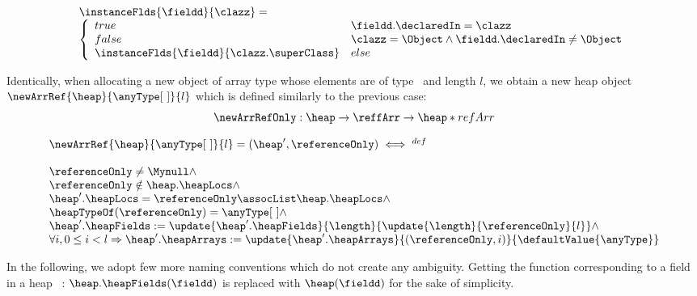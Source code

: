 $$
 \begin{array}{l}
       \instanceFlds{\fieldd}{\clazz } = \\
       \left\{\begin{array}{ll}
                    true  & \fieldd.\declaredIn = \clazz \\
		    false & \clazz = \Object \wedge \fieldd.\declaredIn \neq \Object \\
		    \instanceFlds{\fieldd}{\clazz.\superClass} & else
       \end{array}\right.
 \end{array}
$$


Identically, when allocating a new object of array type whose elements are of type \anyType \ and length $l$, we obtain 
a new heap object  $\newArrRef{\heap}{\anyType \lbrack \ \rbrack  }{l} $ which is defined similarly to the previous case: 
$$ \newArrRefOnly :  \heap \rightarrow  \reffArr \rightarrow  \heap * refArr $$

 $$  \begin{array}{l}
            \newArrRef{\heap}{\anyType\lbrack \ \rbrack}{l} = (\heap', \referenceOnly)      \iff^{def} \\
	    \\
	    \referenceOnly \neq \Mynull \wedge \\ 
	    \referenceOnly \notin \heap.\heapLocs \wedge   \\ 
	    \heap'.\heapLocs = \referenceOnly \assocList \heap.\heapLocs \wedge \\ 
	    \heapTypeOf( \referenceOnly ) = \anyType\lbrack \ \rbrack  \wedge \\ 
            \heap'.\heapFields :=  \update{\heap'.\heapFields}{\length}{\update{\length}{ \referenceOnly}{ l }} \wedge  \\
	    \forall i, 0 \le i < l  \Rightarrow   \heap'.\heapArrays :=
            \update{\heap'.\heapArrays}{(\referenceOnly , i)}{ \defaultValue{\anyType }  } \\
	     
     \end{array} $$



In the following, we adopt few more naming conventions which do not create any ambiguity.
 Getting the function corresponding to a field \fieldd in a heap \heap \ :
$ \heap . \heapFields ( \fieldd)$ is replaced  with $ \heap  ( \fieldd)$ for the sake of simplicity.
 
